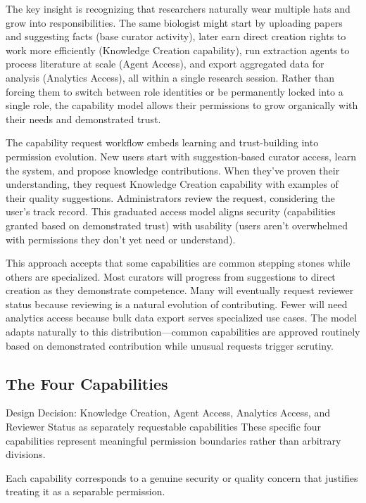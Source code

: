 \documentclass[12pt,a4paper]{article}
\begin{document}
The key insight is recognizing that researchers naturally wear multiple hats and grow into responsibilities. The same biologist might start by uploading papers and suggesting facts (base curator activity), later earn direct creation rights to work more efficiently (Knowledge Creation capability), run extraction agents to process literature at scale (Agent Access), and export aggregated data for analysis (Analytics Access), all within a single research session. Rather than forcing them to switch between role identities or be permanently locked into a single role, the capability model allows their permissions to grow organically with their needs and demonstrated trust.

The capability request workflow embeds learning and trust-building into permission evolution. New users start with suggestion-based curator access, learn the system, and propose knowledge contributions. When they've proven their understanding, they request Knowledge Creation capability with examples of their quality suggestions. Administrators review the request, considering the user's track record. This graduated access model aligns security (capabilities granted based on demonstrated trust) with usability (users aren't overwhelmed with permissions they don't yet need or understand).

This approach accepts that some capabilities are common stepping stones while others are specialized. Most curators will progress from suggestions to direct creation as they demonstrate competence. Many will eventually request reviewer status because reviewing is a natural evolution of contributing. Fewer will need analytics access because bulk data export serves specialized use cases. The model adapts naturally to this distribution—common capabilities are approved routinely based on demonstrated contribution while unusual requests trigger scrutiny.

\subsection{The Four Capabilities}

\begin{rationale}{Design Decision: Knowledge Creation, Agent Access, Analytics Access, and Reviewer Status as separately requestable capabilities}
These specific four capabilities represent meaningful permission boundaries rather than arbitrary divisions.
\end{rationale}

Each capability corresponds to a genuine security or quality concern that justifies treating it as a separable permission. 
\end{document}
